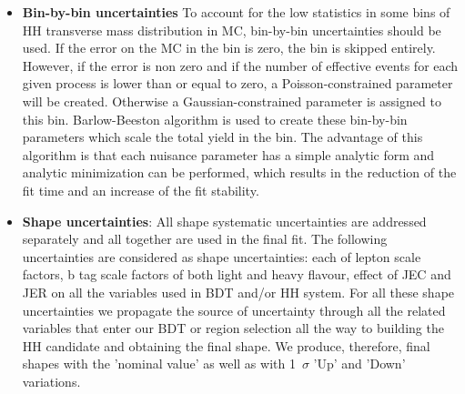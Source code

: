 \begin{itemize}
 \item {\bf Bin-by-bin uncertainties } To account for the low statistics in some bins of HH transverse mass distribution in MC, bin-by-bin uncertainties should be used. If the error on the MC in the bin is zero, the bin is skipped entirely. However, if the error is non zero and if the number of effective events for each given process is lower than or equal to zero, a Poisson-constrained parameter will be created. Otherwise a Gaussian-constrained parameter is assigned to this bin. Barlow-Beeston algorithm is used to create these bin-by-bin parameters which scale the total yield in the bin. The advantage of this algorithm is that each nuisance parameter has a simple analytic form and analytic minimization can be performed, which results in the reduction of the fit time and an increase of the fit stability.

 \item {\bf Shape uncertainties}: All shape systematic
   uncertainties are addressed separately and all together are used in the final fit. The following uncertainties are considered as shape
   uncertainties: each of lepton scale factors, b tag scale factors of
   both light and heavy flavour, effect of JEC and JER on all the variables used in
   BDT and/or HH system. For all these shape uncertainties we
   propagate the source of uncertainty through all the related
   variables that enter our BDT or region selection all the way to
   building the HH candidate and obtaining the final shape.  We
   produce, therefore, final shapes with the 'nominal value' as well
   as with 1~$\sigma$ 'Up' and 'Down' variations. 

\end{itemize}





